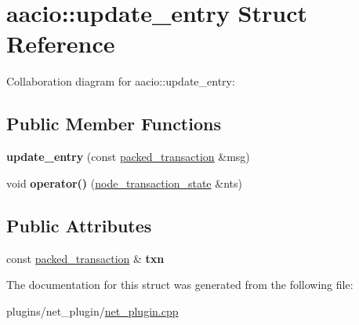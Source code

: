 \hypertarget{structaacio_1_1update__entry}{}\section{aacio\+:\+:update\+\_\+entry Struct Reference}
\label{structaacio_1_1update__entry}


Collaboration diagram for aacio\+:\+:update\+\_\+entry\+:
\subsection*{Public Member Functions}
\begin{DoxyCompactItemize}
\item 
\mbox{\label{structaacio_1_1update__entry_a806d4ab08e82038a496dd92580448a8e}} 
{\bfseries update\+\_\+entry} (const \mbox{\hyperlink{structaacio_1_1chain_1_1packed__transaction}{packed\+\_\+transaction}} \&msg)
\item 
\mbox{\label{structaacio_1_1update__entry_ad0a2b48e80af281181fec67ae2d94dad}} 
void {\bfseries operator()} (\mbox{\hyperlink{structaacio_1_1node__transaction__state}{node\+\_\+transaction\+\_\+state}} \&nts)
\end{DoxyCompactItemize}
\subsection*{Public Attributes}
\begin{DoxyCompactItemize}
\item 
\mbox{\label{structaacio_1_1update__entry_a651b68f61cf2e7451463015a22cd1ab8}} 
const \mbox{\hyperlink{structaacio_1_1chain_1_1packed__transaction}{packed\+\_\+transaction}} \& {\bfseries txn}
\end{DoxyCompactItemize}


The documentation for this struct was generated from the following file\+:\begin{DoxyCompactItemize}
\item 
plugins/net\+\_\+plugin/\mbox{\hyperlink{net__plugin_8cpp}{net\+\_\+plugin.\+cpp}}\end{DoxyCompactItemize}
